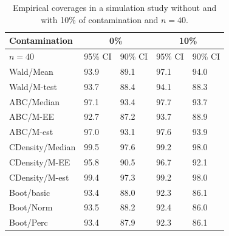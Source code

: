 \documentclass[preprint,12pt,authoryear]{elsarticle}
\begin{document}
\begin{table}[h!]
\centering
\begin{tabular}{|l|l|l|l|l|} \hline%
 Contamination &\multicolumn{2}{c|}{0\%} & \multicolumn{2}{c|}{10\%}   \\  
\hline
 $n=40$ & 95\% CI   &  90\%  CI &     95\% CI   &  90\%  CI  \\ \hline %
Wald/Mean& 93.9 &89.1 &   97.1&94.0  \\
Wald/M-test & 93.7 & 88.4 &  94.1&  88.3\\
ABC/Median& 97.1 &93.4 & 97.7  & 93.7 \\
ABC/M-EE & 92.7 &87.2 & 93.7  &88.9  \\
ABC/M-est &97.0 &93.1 & 97.6  & 93.9 \\
CDensity/Median &99.5  & 97.6&  99.2 &98.0  \\
CDensity/M-EE&  95.8&90.5 & 96.7  &  92.1\\
CDensity/M-est &99.4 & 97.3 & 99.2  & 98.0 \\
Boot/basic& 93.4 & 88.0 & 92.3 & 86.1\\
Boot/Norm &93.5 & 88.2 &92.4 & 86.0\\
Boot/Perc & 93.4  & 87.9 &92.3 & 86.1 \\
 \hline
\end{tabular}
\caption{Empirical coverages in a simulation study  without and with
10\% of contamination and $n=40$. }
\label{sim_40}
\end{table}
\end{document}
